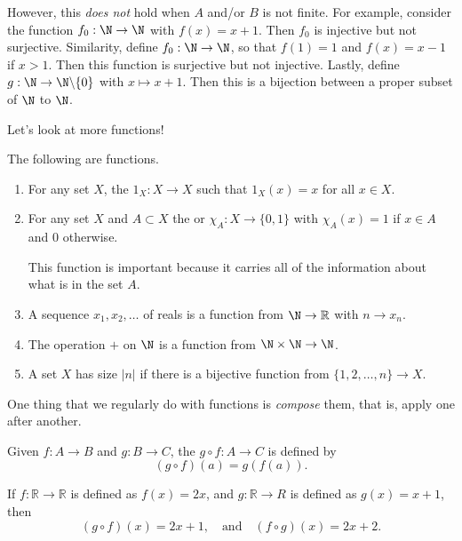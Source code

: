 \documentclass[a4paper]{scrartcl}
\begin{document}
However, this \emph{does not} hold when $A$ and/or $B$ is not finite. For example, consider the function $f_0: \N \rightarrow \N$ with $f(x) = x + 1$. Then $f_0$ is injective but not surjective.
Similarity, define $f_0 : \N \rightarrow \N$, so that $f(1) = 1$ and $f(x) = x - 1$ if $x > 1$. Then this function is surjective but not injective. Lastly, define $g: \N \rightarrow \N \backslash \{0\}$ with $x \mapsto x + 1$. Then this is a bijection between a proper subset of $\N$ to $\N$.

Let's look at more functions!

\begin{example}
	The following are functions.
	\begin{enumerate}[label=(\roman*)]
		\item For any set $X$, the  $1_X : X  \rightarrow X$ such that $1_X(x) = x$ for all $x \in X$.
		\item For any set $X$ and $A \subset X$ the  or  $\chi_A: X \rightarrow \{0, 1\}$ with $\chi_A(x) = 1$ if $x \in A$ and 0 otherwise.
		
		This function is important because it carries all of the information about what is in the set $A$.
		\item A sequence $x_1, x_2, \dots$ of reals is a function from $\N \rightarrow \mathbb{R}$ with $n \rightarrow x_n$.
		\item The operation $+$ on $\N$ is a function from $\N \times \N \rightarrow \N$.
		\item A set $X$ has size $|n|$ if there is a bijective function from $\{1, 2, \dots, n\} \rightarrow X$.
	\end{enumerate}
\end{example}

One thing that we regularly do with functions is \emph{compose} them, that is, apply one after another.

\begin{definition}
	Given $f : A \rightarrow B$ and $g : B \rightarrow C$, the  $g \circ f : A \rightarrow C$ is defined by
	$$
	(g \circ f)(a) = g(f(a)).
	$$
\end{definition}

\begin{example}
	If $f: \mathbb{R} \rightarrow \mathbb{R}$ is defined as $f(x) = 2x$, and $g: \mathbb{R} \rightarrow R$ is defined as $g(x) = x + 1$, then
	$$
	(g \circ f)(x) = 2x + 1, \quad \text{and}\quad (f \circ g)(x) = 2x + 2.
	$$
\end{example}
\end{document}
